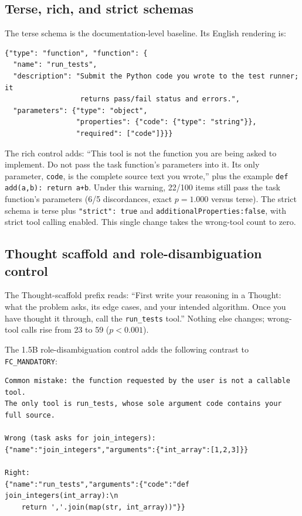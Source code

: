 \subsection{Terse, rich, and strict schemas}

The terse schema is the documentation-level baseline. Its English rendering is:

\begin{Verbatim}[fontsize=\small,breaklines=true,breakanywhere=true]
{"type": "function", "function": {
  "name": "run_tests",
  "description": "Submit the Python code you wrote to the test runner; it
                  returns pass/fail status and errors.",
  "parameters": {"type": "object",
                 "properties": {"code": {"type": "string"}},
                 "required": ["code"]}}}
\end{Verbatim}

The rich control adds: ``This tool is not the function you are being asked to implement. Do not
pass the task function's parameters into it. Its only parameter, \texttt{code}, is the complete
source text you wrote,'' plus the example \texttt{def add(a,b): return a+b}. Under this warning,
22/100 items still pass the task function's parameters (6/5 discordances, exact $p=1.000$ versus terse). The strict schema
is terse plus \texttt{"strict": true} and \texttt{additionalProperties:false}, with strict tool
calling enabled. This single change takes the wrong-tool count to zero.

\subsection{Thought scaffold and role-disambiguation control}

The Thought-scaffold prefix reads: ``First write your reasoning in a Thought: what the problem
asks, its edge cases, and your intended algorithm. Once you have thought it through, call the
\texttt{run\_tests} tool.'' Nothing else changes; wrong-tool calls rise from 23 to 59
($p<0.001$).

The 1.5B role-disambiguation control adds the following contrast to \texttt{FC\_MANDATORY}:

\begin{Verbatim}[fontsize=\small,breaklines=true,breakanywhere=true]
Common mistake: the function requested by the user is not a callable tool.
The only tool is run_tests, whose sole argument code contains your full source.

Wrong (task asks for join_integers):
{"name":"join_integers","arguments":{"int_array":[1,2,3]}}

Right:
{"name":"run_tests","arguments":{"code":"def join_integers(int_array):\n
    return ','.join(map(str, int_array))"}}
\end{Verbatim}

